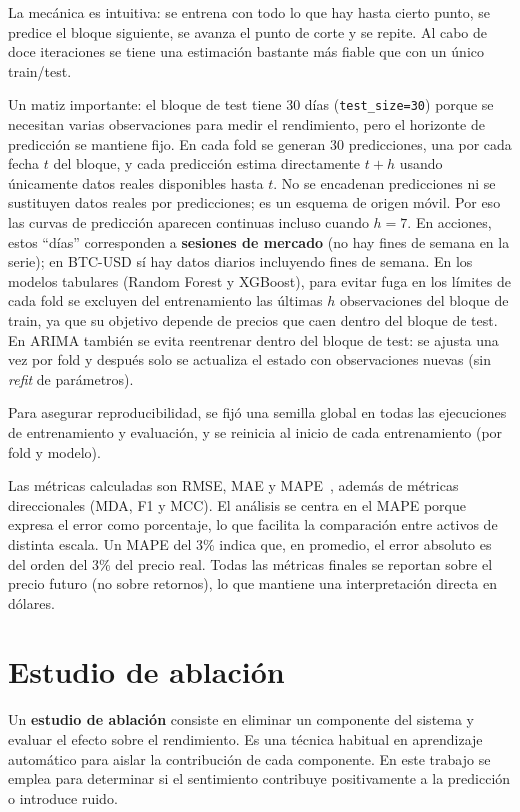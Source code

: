 La mecánica es intuitiva: se entrena con todo lo que hay hasta cierto punto, se predice el bloque siguiente, se avanza el punto de corte y se repite. Al cabo de doce iteraciones se tiene una estimación bastante más fiable que con un único train/test.

Un matiz importante: el bloque de test tiene 30 días (\texttt{test\_size=30}) porque se necesitan varias observaciones para medir el rendimiento, pero el horizonte de predicción se mantiene fijo. En cada fold se generan 30 predicciones, una por cada fecha $t$ del bloque, y cada predicción estima directamente $t+h$ usando únicamente datos reales disponibles hasta $t$. No se encadenan predicciones ni se sustituyen datos reales por predicciones; es un esquema de origen móvil. Por eso las curvas de predicción aparecen continuas incluso cuando $h=7$. En acciones, estos ``días'' corresponden a \textbf{sesiones de mercado} (no hay fines de semana en la serie); en BTC-USD sí hay datos diarios incluyendo fines de semana. En los modelos tabulares (Random Forest y XGBoost), para evitar fuga en los límites de cada fold se excluyen del entrenamiento las últimas $h$ observaciones del bloque de train, ya que su objetivo depende de precios que caen dentro del bloque de test. En ARIMA también se evita reentrenar dentro del bloque de test: se ajusta una vez por fold y después solo se actualiza el estado con observaciones nuevas (sin \textit{refit} de parámetros).

Para asegurar reproducibilidad, se fijó una semilla global en todas las ejecuciones de entrenamiento y evaluación, y se reinicia al inicio de cada entrenamiento (por fold y modelo).

Las métricas calculadas son RMSE, MAE y MAPE~\cite{hyndman2006another}, además de métricas direccionales (MDA, F1 y MCC). El análisis se centra en el MAPE porque expresa el error como porcentaje, lo que facilita la comparación entre activos de distinta escala. Un MAPE del 3\% indica que, en promedio, el error absoluto es del orden del 3\% del precio real. Todas las métricas finales se reportan sobre el precio futuro (no sobre retornos), lo que mantiene una interpretación directa en dólares.

\section{Estudio de ablación}

Un \textbf{estudio de ablación} consiste en eliminar un componente del sistema y evaluar el efecto sobre el rendimiento. Es una técnica habitual en aprendizaje automático para aislar la contribución de cada componente. En este trabajo se emplea para determinar si el sentimiento contribuye positivamente a la predicción o introduce ruido.

